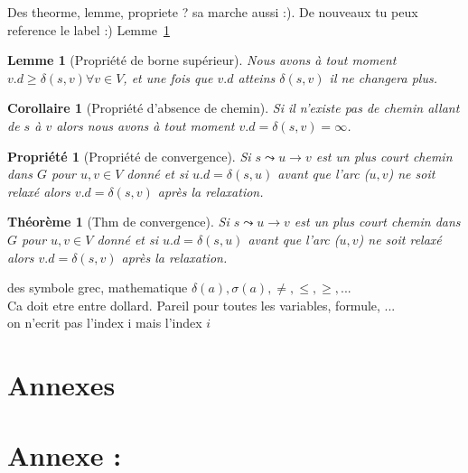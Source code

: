 \documentclass[12pt,a4paper,final]{article}
\newtheorem{prop}{Propriété}
\newtheorem{corollaire}{Corollaire}
\newtheorem{lemme}{Lemme}
\newtheorem{thm}{Théorème}
\begin{document}

Des theorme, lemme, propriete ? sa marche aussi :). De nouveaux tu peux reference le label :) Lemme~\ref{upper-bound_prop}

\begin{lemme}[Propriété de borne supérieur]\label{upper-bound_prop}
Nous avons à tout moment $v.d \geq \delta(s,v) \forall v \in V$, et une fois que $v.d$ atteins $\delta(s,v)$ il ne changera plus.
\end{lemme}

\begin{corollaire}[Propriété d'absence de chemin]\label{no_path_prop}
Si il n'existe pas de chemin allant de $s$ à $v$ alors nous avons à tout moment $v.d = \delta(s,v) = \infty$.
\end{corollaire}

\begin{prop}[Propriété de convergence]\label{convergence_prop}
Si $s \leadsto u \rightarrow v$ est un plus court chemin dans $G$ pour $u, v \in V$ donné et si $u.d = \delta(s,u)$ avant que l'arc ($u,v$) ne soit relaxé alors $v.d = \delta(s,v)$ après la relaxation.
\end{prop}

\begin{thm}[Thm de convergence]\label{convergence_thm}
Si $s \leadsto u \rightarrow v$ est un plus court chemin dans $G$ pour $u, v \in V$ donné et si $u.d = \delta(s,u)$ avant que l'arc ($u,v$) ne soit relaxé alors $v.d = \delta(s,v)$ après la relaxation.
\end{thm}

des symbole grec, mathematique $\delta(a), \sigma(a), \neq, \leq, \geq, ...$\\
Ca doit etre entre dollard. Pareil pour toutes les variables, formule, ...\\
on n'ecrit pas l'index i mais l'index $i$

\newpage
\section{Annexes} \label{sec:annexe}
\appendix %
\section{Annexe : }



\end{document}
